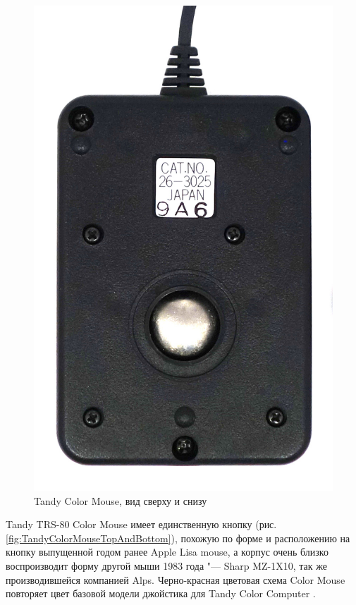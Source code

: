 \documentclass[11pt, a4paper]{article}
\begin{document}
\begin{figure}[h]
    \includegraphics[scale=0.55]{1984_tandy_trs80_color_mouse/bottom_60.jpg}
    \caption{Tandy Color Mouse, вид сверху и снизу}
    \label{TandyColorMouseTopAndBottom}
\end{figure}

Tandy TRS-80 Color Mouse имеет единственную кнопку (рис. \ref{fig:TandyColorMouseTopAndBottom}), похожую по форме и расположению на кнопку выпущенной годом ранее Apple Lisa mouse, а корпус очень близко воспроизводит форму другой мыши 1983 года "--- Sharp MZ-1X10, так же производившейся компанией Alps. Черно-красная цветовая схема Color Mouse повторяет цвет базовой модели джойстика для Tandy Color Computer \cite{hierophant}.
\end{document}

